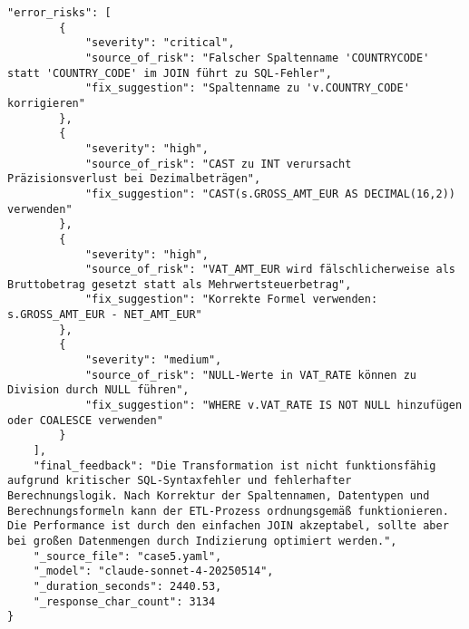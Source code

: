 \begin{lstlisting}[caption={Ausgabe: Claude Sonnet 4 Anwendungsfall 5 Robustheitsdurchlauf},label={claude_case5_prompt3}]
    "error_risks": [
        {
            "severity": "critical",
            "source_of_risk": "Falscher Spaltenname 'COUNTRYCODE' statt 'COUNTRY_CODE' im JOIN führt zu SQL-Fehler",
            "fix_suggestion": "Spaltenname zu 'v.COUNTRY_CODE' korrigieren"
        },
        {
            "severity": "high",
            "source_of_risk": "CAST zu INT verursacht Präzisionsverlust bei Dezimalbeträgen",
            "fix_suggestion": "CAST(s.GROSS_AMT_EUR AS DECIMAL(16,2)) verwenden"
        },
        {
            "severity": "high",
            "source_of_risk": "VAT_AMT_EUR wird fälschlicherweise als Bruttobetrag gesetzt statt als Mehrwertsteuerbetrag",
            "fix_suggestion": "Korrekte Formel verwenden: s.GROSS_AMT_EUR - NET_AMT_EUR"
        },
        {
            "severity": "medium",
            "source_of_risk": "NULL-Werte in VAT_RATE können zu Division durch NULL führen",
            "fix_suggestion": "WHERE v.VAT_RATE IS NOT NULL hinzufügen oder COALESCE verwenden"
        }
    ],
    "final_feedback": "Die Transformation ist nicht funktionsfähig aufgrund kritischer SQL-Syntaxfehler und fehlerhafter Berechnungslogik. Nach Korrektur der Spaltennamen, Datentypen und Berechnungsformeln kann der ETL-Prozess ordnungsgemäß funktionieren. Die Performance ist durch den einfachen JOIN akzeptabel, sollte aber bei großen Datenmengen durch Indizierung optimiert werden.",
    "_source_file": "case5.yaml",
    "_model": "claude-sonnet-4-20250514",
    "_duration_seconds": 2440.53,
    "_response_char_count": 3134
}
\end{lstlisting}

